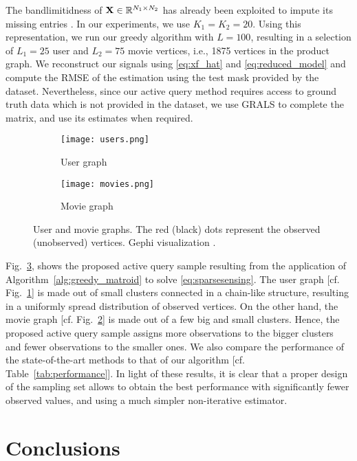\documentclass{article}
\begin{document}
The bandlimitidness of $\boldsymbol{\mathrm{X}}\in\mathbb{R}^{N_1\times N_2}$ has already been exploited to impute its missing entries \cite{marques,kalofolias2014matrix}. In our experiments, we use $K_1=K_2=20$. Using this representation, we run our greedy algorithm with $L=100$, resulting in a selection of $L_1=25$ user and $L_2=75$ movie vertices, i.e., 1875 vertices in the product graph. We reconstruct our signals using \eqref{eq:xf_hat} and \eqref{eq:reduced_model} and compute the RMSE of the estimation using the test mask provided by the dataset. Nevertheless, since our active query method requires access to ground truth data which is not provided in the dataset, we use GRALS \cite{grals} to complete the matrix, and use its estimates when required.

\begin{figure}[t]
    \centering
    \begin{subfigure}[b]{0.46\columnwidth}
        \texttt{[image: users.png]}
        \caption{User graph}
        \label{fig:users}
    \end{subfigure}
    \hfill
    \begin{subfigure}[b]{0.46\columnwidth}
        \texttt{[image: movies.png]}
        \caption{Movie graph}
        \label{fig:movies}
    \end{subfigure}
    \caption{User and movie graphs. The red (black) dots represent the observed (unobserved) vertices. Gephi visualization \cite{gephi}.}\label{fig:graphs}
\end{figure}

Fig.~\ref{fig:graphs}, shows the proposed active query sample resulting from the application of Algorithm~\ref{alg:greedy_matroid} to solve \eqref{eq:sparsesensing}. The user graph [cf. Fig.~\ref{fig:users}] is made out of small clusters connected in a chain-like structure, resulting in a uniformly spread distribution of observed vertices. On the other hand, the movie graph [cf. Fig.~\ref{fig:movies}] is made out of a few big and small clusters. Hence, the proposed active query sample assigns more observations to the bigger clusters and fewer observations to the smaller ones. We also compare the performance of the state-of-the-art methods to that of our algorithm [cf. Table~\ref{tab:performance}]. In light of these results, it is clear that a proper design of the sampling set allows to obtain the best performance with significantly fewer observed values, and using a much simpler non-iterative estimator.

\section{Conclusions}
\end{document}
